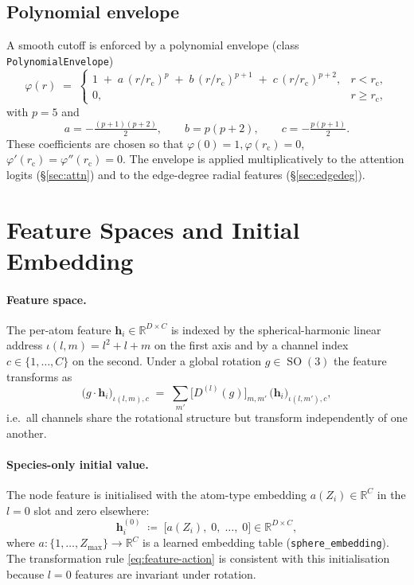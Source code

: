 \documentclass[11pt,a4paper]{article}
\DeclareMathOperator{\SO}{SO}
\newcommand{\R}{\mathbb{R}}
\newcommand{\bh}{\bm{h}}
\newcommand{\rcut}{r_{\mathrm{c}}}
\theoremstyle{plain}
\theoremstyle{definition}
\theoremstyle{remark}
\begin{document}
\subsection{Polynomial envelope}\label{sec:env}

A smooth cutoff is enforced by a polynomial envelope (class
\texttt{PolynomialEnvelope})
\begin{equation}\label{eq:env}
    \varphi(r)\;=\;
    \begin{cases}
        1\;+\;a\,(r/\rcut)^p\;+\;b\,(r/\rcut)^{p+1}\;+\;c\,(r/\rcut)^{p+2}, & r<\rcut,   \\
        0,                                                                  & r\ge\rcut,
    \end{cases}
\end{equation}
with $p=5$ and
\begin{equation}\label{eq:env-coefs}
    a=-\tfrac{(p+1)(p+2)}{2},\qquad b=p(p+2),\qquad c=-\tfrac{p(p+1)}{2}.
\end{equation}
These coefficients are chosen so that $\varphi(0)=1,\varphi(\rcut)=0$, $\varphi'(\rcut)=\varphi''(\rcut)=0$.
The envelope is applied multiplicatively to the attention logits (\S\ref{sec:attn}) and to the edge-degree radial features (\S\ref{sec:edgedeg}).

\section{Feature Spaces and Initial Embedding}\label{sec:init}

\paragraph{Feature space.}
The per-atom feature $\bh_i\in\R^{D\times C}$ is indexed by the
spherical-harmonic linear address $\iota(l,m)=l^2+l+m$ on the first axis and by
a channel index $c\in\{1,\dots,C\}$ on the second. Under a global rotation
$g\in\SO(3)$ the feature transforms as
\begin{equation}\label{eq:feature-action}
    \bigl(g\cdot\bh_i\bigr)_{\iota(l,m),c}\;=\;\sum_{m'}\bigl[D^{(l)}(g)\bigr]_{m,m'}\,\bigl(\bh_i\bigr)_{\iota(l,m'),c},
\end{equation}
i.e.\ all channels share the rotational structure but transform independently of one another.

\paragraph{Species-only initial value.}
The node feature is initialised with the atom-type embedding $a(Z_i)\in\R^C$ in
the $l=0$ slot and zero elsewhere:
\begin{equation}\label{eq:init-h}
    \bh^{(0)}_i\;\coloneqq\;\bigl[a(Z_i),\;0,\;\dots,\;0\bigr]\in\R^{D\times C},
\end{equation}
where $a\colon\{1,\dots,Z_{\max}\}\to\R^C$ is a learned embedding table (\texttt{sphere\_embedding}).
The transformation rule \eqref{eq:feature-action} is consistent with this initialisation because $l=0$ features are invariant under rotation.
\end{document}
